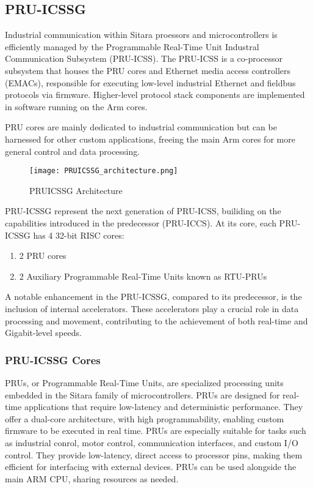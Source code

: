 \subsection{PRU-ICSSG}

Industrial communication within Sitara proessors and microcontrollers is
efficiently managed by the Programmable Real-Time Unit Industral Communication
Subsystem (PRU-ICSS). The PRU-ICSS is a co-processor subsystem that houses the
PRU cores and Ethernet media access controllers (EMACs), responsible for
executing low-level industrial Ethernet and fieldbus protocols via firmware.
Higher-level protocol stack components are implemented in software running on
the Arm cores.

PRU cores are mainly dedicated to industrial communication but can be harnessed
for other custom applications, freeing the main Arm cores for more general
control and data processing.

\begin{figure}[ht]
    \centering
    \texttt{[image: PRUICSSG\_architecture.png]}
    \caption{PRUICSSG Architecture}
\end{figure}


PRU-ICSSG represent the next generation of PRU-ICSS, builiding on the
capabilities introduced in the predecessor (PRU-ICCS).
At its core, each PRU-ICSSG has 4 32-bit RISC cores:

\begin{enumerate}
    \item 2 PRU cores
    \item 2 Auxiliary Programmable Real-Time Units known as RTU-PRUs
\end{enumerate}


A notable enhancement in the PRU-ICSSG, compared to its predecessor, is the
inclusion of internal accelerators. These accelerators play a crucial role in
data processing and movement, contributing to the achievement of both real-time
and Gigabit-level speeds.

\subsubsection{PRU-ICSSG Cores}

PRUs, or Programmable Real-Time Units, are specialized processing units
embedded in the Sitara family of microcontrollers. PRUs are designed for
real-time applications that require low-latency and deterministic performance.
They offer a dual-core architecture, with high programmability, enabling custom
firmware to be executed in real time. PRUs are especially suitable for tasks
such as industrial conrol, motor control, communication interfaces, and custom
I/O control. They provide low-latency, direct access to processor pins, making
them efficient for interfacing with external devices. PRUs can be used
alongside the main ARM CPU, sharing resources as needed.

